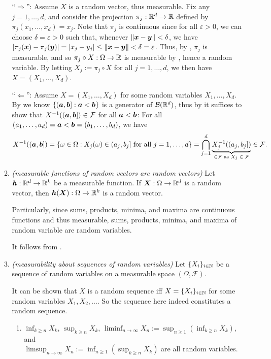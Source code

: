 \begin{enumerate}
\begin{enumerate}
\begin{pf}
``\(\Rightarrow\)'': Assume \(X\) is a random vector, thus measurable. Fix any
\(j=1,\dotsc,d\), and consider the projection \(\pi_j:\mathbb{R}^d\to\mathbb{R}\) defined by
\(\pi_j(x_1,\dotsc,x_d)=x_j\). Note that \(\pi_j\) is continuous since for all
\(\varepsilon>0\), we can choose \(\delta=\varepsilon>0\) such that, whenever
\(\|\bm{x}-\bm{y}\|<\delta\), we have
\(|\pi_{j}(\bm{x})-\pi_j(\bm{y})|=|x_j-y_j|\le\|\bm{x}-\bm{y}\|
<\delta=\varepsilon\).
Thus, by , \(\pi_j\) is measurable, and so
 \(\pi_j\circ X:\Omega\to\mathbb{R}\) is measurable by ,
hence a random variable. By letting \(X_j:=\pi_j\circ X\) for all
\(j=1,\dotsc,d\), we then have \(X=(X_1,\dotsc,X_d)\).

``\(\Leftarrow\)'': Assume \(X=(X_1,\dotsc,X_d)\) for some random variables
\(X_1,\dotsc,X_d\).  By  we know
\(\{(\bm{a},\bm{b}]:\bm{a}<\bm{b}\}\) is a generator of
\(\mathcal{B}(\mathbb{R}^d)\), thus by  it
suffices to show that \(X^{-1}((\bm{a},\bm{b}])\in\mathcal{F}\) for all
\(\bm{a}<\bm{b}\): For all
\((a_1,\dotsc,a_d)=\bm{a}<\bm{b}=(b_1,\dotsc,b_d)\), we have
\[
X^{-1}((\bm{a},\bm{b}])
=\{\omega\in\Omega:X_j(\omega)\in(a_j,b_j]\text{ for all \(j=1,\dotsc,d\)}\}
=\bigcap_{j=1}^{d}\underbrace{X_j^{-1}((a_j,b_j])}_{\in\mathcal{F}\text{ as \(X_j\in\mathcal{F}\)}}
\in\mathcal{F}.
\]
\end{pf}
\item \label{it:meas-fn-ran-vec} \emph{(measurable functions of random vectors
are random vectors)} Let \(\bm{h}:\mathbb{R}^d\to\mathbb{R}^k\) be a measurable function. If
\(\bm{X}:\Omega\to\mathbb{R}^d\) is a random vector, then
\(\bm{h}(\bm{X}):\Omega\to\mathbb{R}^k\) is a random vector.

\begin{note}
Particularly, since sums, products, minima, and maxima are continuous functions
and thus measurable, sums, products, minima, and maxima of random variable are
random variables.
\end{note}

\begin{pf}
It follows from .
\end{pf}
\item \label{it:seq-rvs-meas} \emph{(measurability about sequences of random variables)}
Let \(\{X_{i}\}_{i\in\mathbb{N}}\) be a sequence of random variables on a measurable
space \((\Omega,\mathcal{F})\). \begin{note}
It can be shown that \(X\) is a random sequence iff \(X=\{X_{i}\}_{i\in\mathbb{N}}\)
for some random variables \(X_1,X_2,\dotsc\). So the sequence here indeed
constitutes a random sequence.
\end{note}
\begin{enumerate}
\item \(\inf_{k\ge n}X_k\), \(\sup_{k\ge n}X_k\), \(\liminf_{n\to \infty}X_n
:=\sup_{n\ge 1}(\inf_{k\ge n}X_k)\), and \\
\(\limsup_{n\to\infty}X_n:=\inf_{n\ge 1}(\sup_{k\ge n}X_k)\) are all random
variables.


\end{enumerate}
\end{enumerate}
\end{enumerate}
